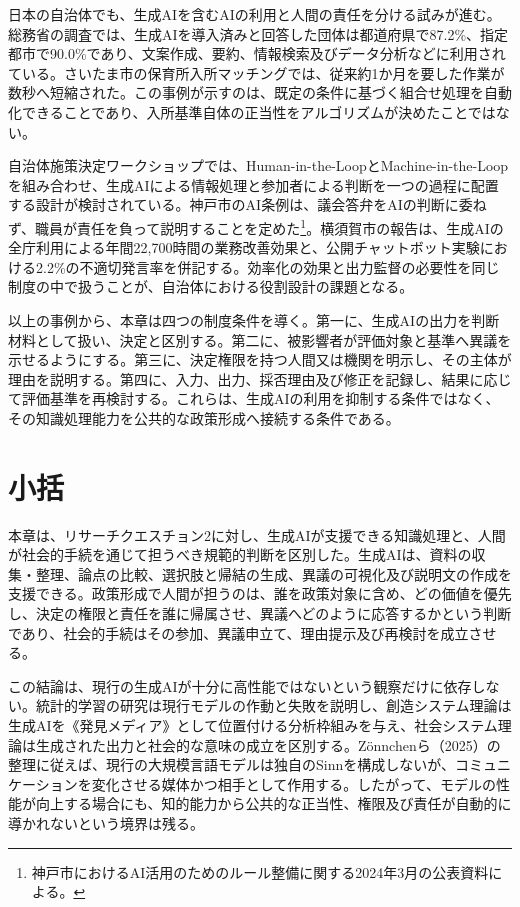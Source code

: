 日本の自治体でも、生成AIを含むAIの利用と人間の責任を分ける試みが進む。総務省の調査では、生成AIを導入済みと回答した団体は都道府県で87.2\%、指定都市で90.0\%であり、文案作成、要約、情報検索及びデータ分析などに利用されている\cite{soumu2022ai}。さいたま市の保育所入所マッチングでは、従来約1か月を要した作業が数秒へ短縮された\cite{miyazaki2018matching}。この事例が示すのは、既定の条件に基づく組合せ処理を自動化できることであり、入所基準自体の正当性をアルゴリズムが決めたことではない。

自治体施策決定ワークショップでは、Human-in-the-LoopとMachine-in-the-Loopを組み合わせ、生成AIによる情報処理と参加者による判断を一つの過程に配置する設計が検討されている\cite{ohori2025workshop}。神戸市のAI条例は、議会答弁をAIの判断に委ねず、職員が責任を負って説明することを定めた\footnote{神戸市におけるAI活用のためのルール整備に関する2024年3月の公表資料による。}。横須賀市の報告は、生成AIの全庁利用による年間22,700時間の業務改善効果と、公開チャットボット実験における2.2\%の不適切発言率を併記する\cite{yokosuka2023chatgpt}。効率化の効果と出力監督の必要性を同じ制度の中で扱うことが、自治体における役割設計の課題となる。

以上の事例から、本章は四つの制度条件を導く。第一に、生成AIの出力を判断材料として扱い、決定と区別する。第二に、被影響者が評価対象と基準へ異議を示せるようにする。第三に、決定権限を持つ人間又は機関を明示し、その主体が理由を説明する。第四に、入力、出力、採否理由及び修正を記録し、結果に応じて評価基準を再検討する。これらは、生成AIの利用を抑制する条件ではなく、その知識処理能力を公共的な政策形成へ接続する条件である。

\section{小括}

本章は、リサーチクエスチョン2に対し、生成AIが支援できる知識処理と、人間が社会的手続を通じて担うべき規範的判断を区別した。生成AIは、資料の収集・整理、論点の比較、選択肢と帰結の生成、異議の可視化及び説明文の作成を支援できる。政策形成で人間が担うのは、誰を政策対象に含め、どの価値を優先し、決定の権限と責任を誰に帰属させ、異議へどのように応答するかという判断であり、社会的手続はその参加、異議申立て、理由提示及び再検討を成立させる。

この結論は、現行の生成AIが十分に高性能ではないという観察だけに依存しない。統計的学習の研究は現行モデルの作動と失敗を説明し、創造システム理論は生成AIを《発見メディア》として位置付ける分析枠組みを与え、社会システム理論は生成された出力と社会的な意味の成立を区別する。Zönnchenら（2025）の整理に従えば、現行の大規模言語モデルは独自のSinnを構成しないが、コミュニケーションを変化させる媒体かつ相手として作用する\cite{zonnchen2025autopoiesis}。したがって、モデルの性能が向上する場合にも、知的能力から公共的な正当性、権限及び責任が自動的に導かれないという境界は残る。

